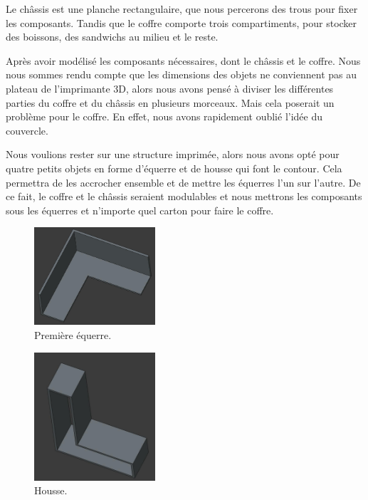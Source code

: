 \documentclass[a4paper,12pt]{report}  %
\begin{document}
Le châssis est une planche rectangulaire, que nous percerons des trous pour fixer les composants. Tandis que le coffre comporte trois compartiments, pour stocker des boissons, des sandwichs au milieu et le reste.

Après avoir modélisé les composants nécessaires, dont le châssis et le coffre. Nous nous sommes rendu compte que les dimensions des objets ne conviennent pas au plateau de l’imprimante 3D, alors nous avons pensé à diviser les différentes parties du coffre et du châssis en plusieurs morceaux. Mais cela poserait un problème pour le coffre. En effet, nous avons rapidement oublié l’idée du couvercle.

Nous voulions rester sur une structure imprimée, alors nous avons opté pour quatre petits objets en forme d'équerre et de housse qui font le contour. Cela permettra de les accrocher ensemble et de mettre les équerres l’un sur l’autre. De ce fait, le coffre et le châssis seraient modulables et nous mettrons les composants sous les équerres et n’importe quel carton pour faire le coffre.

\begin{figure}[H]
	\centering
	\includegraphics[width=0.4\textwidth]{./attachments/cad_equerre.jpg}
	\caption{Première équerre.}
\end{figure}

\begin{figure}[H]
	\centering
	\includegraphics[width=0.4\textwidth]{./attachments/cad_housse.jpg}
	\caption{Housse.}
\end{figure}
\end{document}
